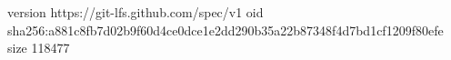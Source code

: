 version https://git-lfs.github.com/spec/v1
oid sha256:a881c8fb7d02b9f60d4ce0dce1e2dd290b35a22b87348f4d7bd1cf1209f80efe
size 118477
